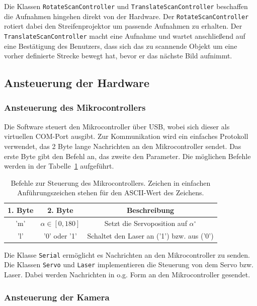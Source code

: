 \documentclass[ngerman,a4paper,parskip=half]{scrartcl}
\begin{document}
Die Klassen \texttt{RotateScanController} und \texttt{TranslateScanController} beschaffen die Aufnahmen hingehen direkt von der Hardware. Der \texttt{RotateScanController} rotiert dabei den Streifenprojektor um passende Aufnahmen zu erhalten. Der \texttt{TranslateScanController} macht eine Aufnahme und wartet anschließend auf eine Bestätigung des Benutzers, dass sich das zu scannende Objekt um eine vorher definierte Strecke bewegt hat, bevor er das nächste Bild aufnimmt.

\subsection{Ansteuerung der Hardware}

\subsubsection{Ansteuerung des Mikrocontrollers}

Die Software steuert den Mikrocontroller über USB, wobei sich dieser als virtuellen COM-Port ausgibt. Zur Kommunikation wird ein einfaches Protokoll verwendet, das 2 Byte lange Nachrichten an den Mikrocontroller sendet. Das erste Byte gibt den Befehl an, das zweite den Parameter. Die möglichen Befehle werden in der Tabelle~\ref{tab:protocol} aufgeführt.

\begin{table}
	\centering
	\begin{tabular}{|c|c|c|}
		\hline
		\bfseries 1. Byte & \bfseries 2. Byte & \bfseries Beschreibung \\
		\hline
		'm' & $\alpha \in [0,180]$ & Setzt die Servoposition auf $\alpha^\circ$\\
		\hline
		'l' & '0' oder '1' & Schaltet den Laser an ('1') bzw. aus ('0')\\
		\hline
	\end{tabular}
	\caption{Befehle zur Steuerung des Mikrocontrollers. Zeichen in einfachen Anführungszeichen stehen für den ASCII-Wert des Zeichens.}
	\label{tab:protocol}
\end{table}

Die Klasse \texttt{Serial} ermöglicht es Nachrichten an den Mikrocontroller zu senden. Die Klassen \texttt{Servo} und \texttt{Laser} implementieren die Steuerung von dem Servo bzw. Laser. Dabei werden Nachrichten in o.g. Form an den Mikrocontroller gesendet.

\subsubsection{Ansteuerung der Kamera}
\end{document}
